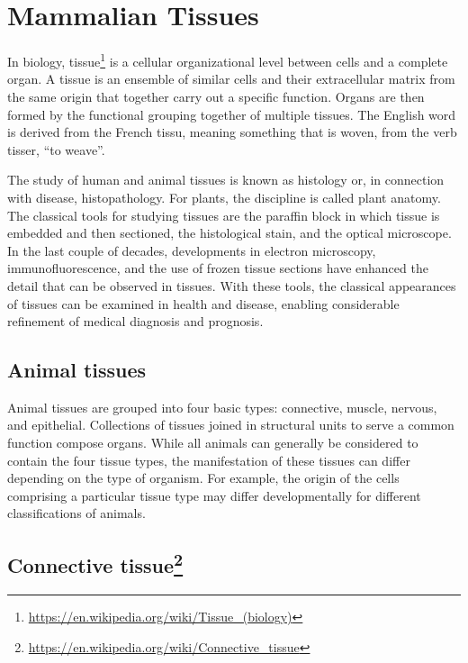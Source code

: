 \documentclass[]{book}
\let\rmarkdownfootnote\footnote%
\def\footnote{\protect\rmarkdownfootnote}
\renewcommand{\href}[2]{#2\footnote{\url{#1}}}
\theoremstyle{definition}
\theoremstyle{definition}
\theoremstyle{definition}
\theoremstyle{remark}
\begin{document}
\chapter{Mammalian Tissues}\label{mammalian-tissues}

In biology,
\href{https://en.wikipedia.org/wiki/Tissue_(biology)}{tissue} is a
cellular organizational level between cells and a complete organ. A
tissue is an ensemble of similar cells and their extracellular matrix
from the same origin that together carry out a specific function. Organs
are then formed by the functional grouping together of multiple tissues.
The English word is derived from the French tissu, meaning something
that is woven, from the verb tisser, ``to weave''.

The study of human and animal tissues is known as histology or, in
connection with disease, histopathology. For plants, the discipline is
called plant anatomy. The classical tools for studying tissues are the
paraffin block in which tissue is embedded and then sectioned, the
histological stain, and the optical microscope. In the last couple of
decades, developments in electron microscopy, immunofluorescence, and
the use of frozen tissue sections have enhanced the detail that can be
observed in tissues. With these tools, the classical appearances of
tissues can be examined in health and disease, enabling considerable
refinement of medical diagnosis and prognosis.

\section{Animal tissues}\label{animal-tissues}

Animal tissues are grouped into four basic types: connective, muscle,
nervous, and epithelial. Collections of tissues joined in structural
units to serve a common function compose organs. While all animals can
generally be considered to contain the four tissue types, the
manifestation of these tissues can differ depending on the type of
organism. For example, the origin of the cells comprising a particular
tissue type may differ developmentally for different classifications of
animals.

\section{\texorpdfstring{\href{https://en.wikipedia.org/wiki/Connective_tissue}{Connective
tissue}}{Connective tissue}}\label{connective-tissue}
\end{document}
